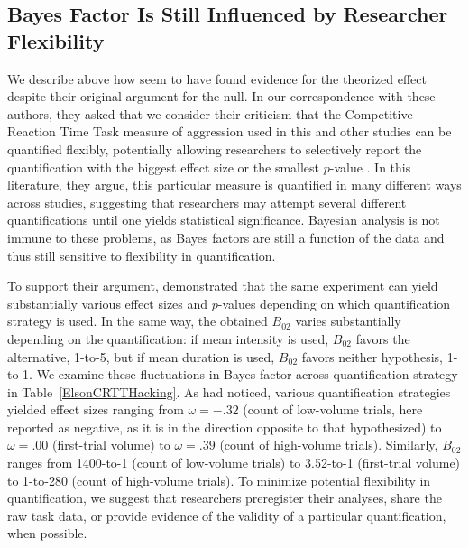 \documentclass[man]{apa6}
\begin{document}
\subsection{Bayes Factor Is Still Influenced by Researcher Flexibility} 
We describe above how \citet{Elson:etal:2013} seem to have found evidence for the theorized effect despite their original argument for the null. In our correspondence with these authors, they asked that we consider their criticism that the Competitive Reaction Time Task measure of aggression used in this and other studies can be quantified flexibly, potentially allowing researchers to selectively report the quantification with the biggest effect size or the smallest $p$-value \citep{Elson:etal:2014}. In this literature, they argue, this particular measure is quantified in many different ways across studies, suggesting that researchers may attempt several different quantifications until one yields statistical significance. Bayesian analysis is not immune to these problems, as Bayes factors are still a function of the data and thus still sensitive to flexibility in quantification. 

To support their argument, \citet{Elson:etal:2014} demonstrated that the same experiment can yield substantially various effect sizes and $p$-values depending on which quantification strategy is used. In the same way, the obtained $B_{02}$ varies substantially depending on the quantification: if mean intensity is used, $B_{02}$ favors the alternative, 1-to-5, but if mean duration is used, $B_{02}$ favors neither hypothesis, 1-to-1. We examine these fluctuations in Bayes factor across quantification strategy in Table~\ref{ElsonCRTTHacking}.  As \citet{Elson:etal:2014} had noticed, various quantification strategies yielded effect sizes ranging from $\omega = -.32$ (count of low-volume trials, here reported as negative, as it is in the direction opposite to that hypothesized) to $\omega = .00$ (first-trial volume) to $\omega = .39$ (count of high-volume trials). Similarly, $B_{02}$ ranges from 1400-to-1 (count of low-volume trials) to 3.52-to-1 (first-trial volume) to 1-to-280 (count of high-volume trials). To minimize potential flexibility in quantification, we suggest that researchers preregister their analyses, share the raw task data, or provide evidence of the validity of a particular quantification, when possible. 
\end{document}
